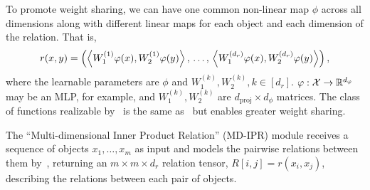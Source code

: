 To promote weight sharing, we can have one common non-linear map $\phi$ across all dimensions along with different linear maps for each object and each dimension of the relation. That is,
\begin{equation}\label{eq:relation_function_lin_proj}
    r(x, y) = \paren{\iprod{W_1^{(1)}\phi(x)}{W_2^{(1)}\phi(y)},\, \ldots,\, \iprod{W_1^{(d_r)}\phi(x)}{W_2^{(d_r)}\phi(y)}},
\end{equation}
where the learnable parameters are $\phi$ and $W_1^{(k)}, W_2^{(k)}, k \in [d_r]$. $\varphi: {\mathcal{X}} \to \mathbb{R}^{d_\varphi}$ may be an MLP, for example, and $W_1^{(k)}, W_2^{(k)}$ are $d_{\mathrm{proj}} \times d_\phi$ matrices. The class of functions realizable by~ is the same as~ but enables greater weight sharing.

The ``Multi-dimensional Inner Product Relation'' (MD-IPR) module receives a sequence of objects $x_1, \ldots, x_m$ as input and models the pairwise relations between them by~, returning an $m \times m \times d_r$ relation tensor, $R[i,j] = r(x_i, x_j)$, describing the relations between each pair of objects.

% 
